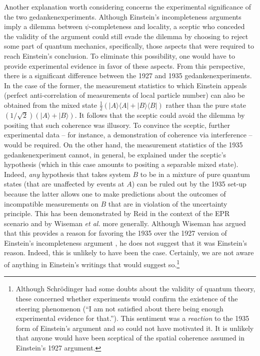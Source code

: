 \documentclass[aps,nofootinbib,12pt]{revtex4-2}
\begin{document}
Another explanation worth considering concerns the experimental
significance of the two gedankenexperiments. Although Einstein's
incompleteness arguments imply a dilemma between $\psi$-completeness
and locality, a sceptic who conceded the validity of the argument
could still evade the dilemma by choosing to reject some part of
quantum mechanics, specifically, those aspects that were required to
reach Einstein's conclusion. To eliminate this possibility, one
would have to provide experimental evidence in favor of these
aspects. From this perspective, there is a significant difference
between the 1927 and 1935 gedankenexperiments. In the case of the
former, the measurement statistics to which Einstein appeals
(perfect anti-correlation of measurements of local particle number)
can also be obtained from the mixed state
$\tfrac{1}{2}(|A\rangle\langle A|+|B\rangle\langle B|)$ rather than
the pure state $(1/\sqrt{2})(|A\rangle+|B\rangle)$. It follows that
the sceptic could avoid the dilemma by positing that such coherence
was illusory. To convince the sceptic, further experimental data --
for instance, a demonstration of coherence via interference -- would
be required. On the other hand, the measurement statistics of the
1935 gedankenexperiment cannot, in general, be explained under the
sceptic's hypothesis (which in this case amounts to positing a
separable mixed state). Indeed, \textit{any} hypothesis that takes
system $B$ to be in a mixture of pure quantum states (that are
unaffected by events at $A$) can be ruled out by the 1935 set-up
because the latter allows one to make predictions about the outcomes
of incompatible measurements on $B$ that are in violation of the
uncertainty principle. This has been demonstrated by Reid in the
context of the EPR scenario \cite{Reid} and by Wiseman \textit{et
al.}\cite{WJD07} more generally. Although Wiseman has argued that
this provides a reason for favoring the 1935 over the 1927 version
of Einstein's incompleteness argument \cite{Wiseman06}, he does not
suggest that it was Einstein's reason. Indeed, this is unlikely to
have been the case. Certainly, we are not aware of anything in
Einstein's writings that would suggest so.\footnote{Although
Schr\"{o}dinger had some doubts about the validity of quantum
theory, these concerned whether experiments would confirm the
existence of the steering phenomenon (``I am not satisfied about
there being enough experimental evidence for
that.''\cite{schroed_steer_quote}). This sentiment was a
\textit{reaction} to the 1935 form of Einstein's argument and so
could not have motivated it. It is unlikely that anyone would have
been sceptical of the spatial coherence assumed in Einstein's 1927
argument.}
\end{document}
